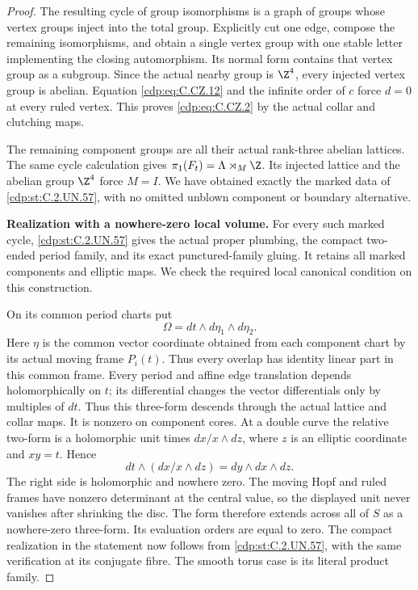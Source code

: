 \begin{proof}
The resulting cycle of group
isomorphisms is a graph of groups
whose vertex groups inject into
the total group. Explicitly cut
one edge, compose the remaining
isomorphisms, and obtain a single
vertex group with one stable
letter implementing the closing
automorphism. Its normal form
contains that vertex group as
a subgroup. Since the actual
nearby group is $\Z^4$, every
injected vertex group is abelian.
Equation \eqref{cdp:eq:C.CZ.12} and the
infinite order of $c$ force
$d=0$ at every ruled vertex.
This proves \eqref{cdp:eq:C.CZ.2} by the
actual collar and clutching maps.

The remaining component groups
are all their actual rank-three
abelian lattices. The same cycle
calculation gives
$\pi_1(F_t)=\Lambda\rtimes_M\Z$.
Its injected lattice and the
abelian group $\Z^4$ force
$M=I$. We have obtained exactly
the marked data of \ref{cdp:st:C.2.UN.57}, with
no omitted unblown component
or boundary alternative.

\par\medskip\noindent\textbf{Realization with a nowhere-zero local volume.}
For every such marked cycle,
\ref{cdp:st:C.2.UN.57} gives the actual proper
plumbing, the compact two-ended
period family, and its exact
punctured-family gluing. It
retains all marked components
and elliptic maps. We check
the required local canonical
condition on this construction.

On its common period charts
put
\[
                       \Omega=dt\wedge d\eta_1\wedge d\eta_2.
\tag{C.CZ.13}\label{cdp:eq:C.CZ.13}
\]
Here $\eta$ is the common
vector coordinate obtained
from each component chart
by its actual moving frame
$P_i(t)$. Thus every overlap
has identity linear part in
this common frame.
Every period and affine edge
translation depends holomorphically
on $t$; its differential changes
the vector differentials only by
multiples of $dt$. Thus this
three-form descends through the
actual lattice and collar maps.
It is nonzero on component cores.
At a double curve the relative
two-form is a holomorphic unit
times $dx/x\wedge dz$, where
$z$ is an elliptic coordinate
and $xy=t$. Hence
\[
             dt\wedge(dx/x\wedge dz)
                               =dy\wedge dx\wedge dz.
\tag{C.CZ.14}\label{cdp:eq:C.CZ.14}
\]
The right side is holomorphic
and nowhere zero. The moving
Hopf and ruled frames have
nonzero determinant at the
central value, so the displayed
unit never vanishes after
shrinking the disc. The form
therefore extends across all
of $S$ as a nowhere-zero
three-form. Its evaluation
orders are equal to zero.
The compact realization in
the statement now follows
from \ref{cdp:st:C.2.UN.57}, with the same
verification at its conjugate
fibre. The smooth torus case
is its literal product family.
\end{proof}

